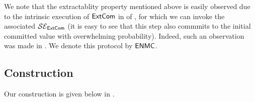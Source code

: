We note that the extractablity property mentioned above is easily observed due to the intrinsic execution of $\ExtCom$ in  of , for which we can invoke the associated $\mathcal{SE}_\mathsf{ExtCom}$ (it is easy to see that this step also commmits to the initial committed value with overwhelming probability). Indeed, such an observation was made in \cite{FOCS:LPY23}. We denote this protocol by $\ENMC$.  





\subsection{Construction}

\iffalse
\xiao{does this repeat the last subsection?}
As outlined above, our construction makes use of the following component schemes with the outlined syntax: 
\begin{itemize}
    \item A malicious sender secure bit OT protocol $\Gamma$, where the sender uses as inputs two strings $(s_0,s_1)$ and receiver uses as input a bit $r$. For technical reasons we will also refer in our construction to the receiver's private random tape in the protocol, which we denote as a string $\tau$ of length $t(\secpar)$ that is a polynomial in the security parameter. We require this scheme to have straightline simulation.  
    \item A parallel $\epsilon$-simulation extractable commitment scheme $\ExtCom$. This consists of an interactive commitment protocol, and a noninteractive decommitment protocol. \xiao{do you really need this?}
    \item A post-quantum many-many \xiao{do you need 1-many or many-many?} non-malleable commitment scheme $\ENMC$, which is also parallel $\epsilon$ simulation-extractable. This also consists of an interactive commitment protocol, and a noninteractive decommitment protocol.  
\end{itemize}
\fi 

Our construction is given below in . 



